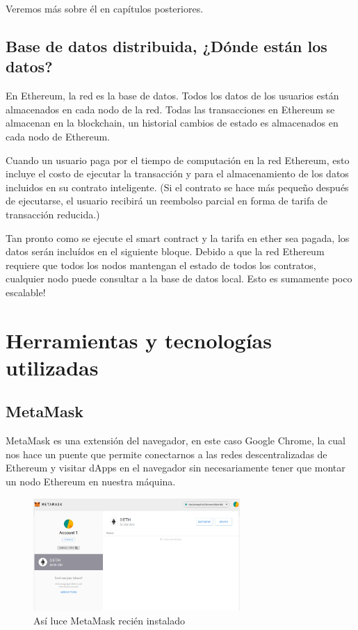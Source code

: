 Veremos más sobre él en capítulos posteriores.

\subsection{Base de datos distribuida, ¿Dónde están los datos?}
En Ethereum, la red es la base de datos. Todos los datos de los usuarios están almacenados en 
cada nodo de la red. Todas las transacciones en Ethereum se almacenan en la blockchain, un
historial cambios de estado es almacenados en cada nodo de Ethereum.

Cuando un usuario paga por el tiempo de computación en la red Ethereum, esto incluye el costo
de ejecutar la transacción y para el almacenamiento de los datos incluidos en su contrato
inteligente. (Si el contrato se hace más pequeño después de ejecutarse, el usuario recibirá un
reembolso parcial en forma de tarifa de transacción reducida.)

Tan pronto como se ejecute el smart contract y la tarifa en ether sea pagada, los datos serán
incluídos en el siguiente bloque. Debido a que la red Ethereum requiere que todos los nodos
mantengan el estado de todos los contratos, cualquier nodo puede consultar a la base de datos
local. Esto es sumamente poco escalable!



\section{Herramientas y tecnologías utilizadas}
\subsection{MetaMask}
MetaMask es una extensión del navegador, en este caso Google Chrome, la cual nos hace un puente
que permite conectarnos a las redes descentralizadas de Ethereum y visitar dApps en el navegador
sin necesariamente tener que montar un nodo Ethereum en nuestra máquina.

\begin{figure}[htbp!] 
\centering    
\includegraphics[width=0.7\textwidth]{metamask-main}
\caption[MetaMaskMain]{Así luce MetaMask recién instalado}
\label{fig:metamask-main}
\end{figure}

